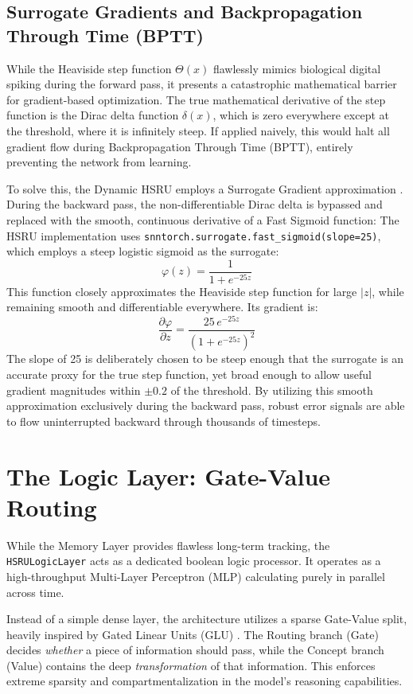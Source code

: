 \documentclass[11pt,a4paper]{article}
\begin{document}
\subsection{Surrogate Gradients and Backpropagation Through Time (BPTT)}
While the Heaviside step function $\Theta(x)$ flawlessly mimics biological digital spiking during the forward pass, it presents a catastrophic mathematical barrier for gradient-based optimization. The true mathematical derivative of the step function is the Dirac delta function $\delta(x)$, which is zero everywhere except at the threshold, where it is infinitely steep. If applied naively, this would halt all gradient flow during Backpropagation Through Time (BPTT), entirely preventing the network from learning.

To solve this, the Dynamic HSRU employs a Surrogate Gradient approximation \cite{neftci2019surrogate}. During the backward pass, the non-differentiable Dirac delta is bypassed and replaced with the smooth, continuous derivative of a Fast Sigmoid function:
The HSRU implementation uses \texttt{snntorch.surrogate.fast\_sigmoid(slope=25)}, which employs a steep logistic sigmoid as the surrogate:
\begin{equation}
    \varphi(z) = \frac{1}{1 + e^{-25z}}
\end{equation}
This function closely approximates the Heaviside step function for large $|z|$, while remaining smooth and differentiable everywhere. Its gradient is:
\begin{equation}
    \frac{\partial \varphi}{\partial z} = \frac{25\, e^{-25z}}{(1 + e^{-25z})^2}
\end{equation}
The slope of 25 is deliberately chosen to be steep enough that the surrogate is an accurate proxy for the true step function, yet broad enough to allow useful gradient magnitudes within $\pm 0.2$ of the threshold. By utilizing this smooth approximation exclusively during the backward pass, robust error signals are able to flow uninterrupted backward through thousands of timesteps.

\section{The Logic Layer: Gate-Value Routing}
While the Memory Layer provides flawless long-term tracking, the \texttt{HSRULogicLayer} acts as a dedicated boolean logic processor. It operates as a high-throughput Multi-Layer Perceptron (MLP) calculating purely in parallel across time. 

Instead of a simple dense layer, the architecture utilizes a sparse Gate-Value split, heavily inspired by Gated Linear Units (GLU) \cite{shazeer2020glu}. The Routing branch (Gate) decides \textit{whether} a piece of information should pass, while the Concept branch (Value) contains the deep \textit{transformation} of that information. This enforces extreme sparsity and compartmentalization in the model's reasoning capabilities.
\end{document}
